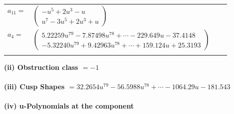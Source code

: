 \documentclass[1p]{elsarticle_modified}
\theoremstyle{definition}
\begin{document}
\begin{tabular}{m{7pt} m{180pt} m{7pt} m{180pt} }
\flushright $a_{11}=$&$\begin{pmatrix}- u^5+2 u^3- u\\u^7-3 u^5+2 u^3+u\end{pmatrix}$ \\
\flushright $a_{4}=$&$\begin{pmatrix}5.22259 u^{79}-7.87498 u^{78}+\cdots-229.649 u-37.4148\\-5.32240 u^{79}+9.42963 u^{78}+\cdots+159.124 u+25.3193\end{pmatrix}$\\&\end{tabular}
\flushleft \textbf{(ii) Obstruction class $= -1$}\\~\\
\flushleft \textbf{(iii) Cusp Shapes $= 32.2654 u^{79}-56.5988 u^{78}+\cdots-1064.29 u-181.543$}\\~\\
\newpage\renewcommand{\arraystretch}{1}
\flushleft \textbf{(iv) u-Polynomials at the component}\newline \\
\end{document}
